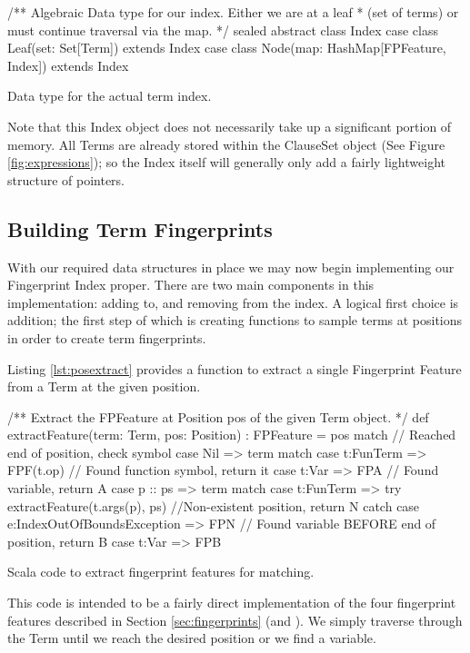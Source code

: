 \begin{listing}[H]
\begin{scalacode}
/** Algebraic Data type for our index. Either we are at a leaf
  * (set of terms) or must continue traversal via the map. */ 
sealed abstract class Index
case class Leaf(set: Set[Term])                 extends Index
case class Node(map: HashMap[FPFeature, Index]) extends Index
\end{scalacode}
\caption{Data type for the actual term index. \protect\cite[p7]{shulz12}}
\label{lst:indexdata}
\end{listing}

Note that this Index object does not necessarily take up a significant portion of memory.
All Terms are already stored within the ClauseSet object (See Figure \ref{fig:expressions});
so the Index itself will generally only add a fairly lightweight structure of pointers.


\subsection{Building Term Fingerprints}
\label{sec:fpbuild}
With our required data structures in place we may now begin implementing our
Fingerprint Index proper. There are two main components in this implementation:
adding to, and removing from the index. A logical first choice is addition; the
first step of which is creating functions to sample terms at positions in order to
create term fingerprints.

Listing \ref{lst:posextract} provides a function to extract a single Fingerprint Feature from
a Term at the given position.
\begin{listing}[H]
\begin{scalacode}
/** Extract the FPFeature at Position pos of the given Term object. */
def extractFeature(term: Term, pos: Position) : FPFeature = pos match {
  // Reached end of position, check symbol
  case Nil     => term match {
    case t:FunTerm => FPF(t.op) // Found function symbol, return it
    case t:Var     => FPA       // Found variable, return A
  }
  case p :: ps => term match {
    case t:FunTerm => try   {extractFeature(t.args(p), ps)}
                      //Non-existent position, return N
                      catch {case e:IndexOutOfBoundsException => FPN}
    // Found variable BEFORE end of position, return B
    case t:Var     => FPB 
  }
}
\end{scalacode}
\caption{Scala code to extract fingerprint features for matching.}
\label{lst:posextract}
\end{listing}
This code is intended to be a fairly direct implementation of the four
fingerprint features described in Section \ref{sec:fingerprints}
(and \cite{shulz12}). We simply traverse through the Term until
we reach the desired position or we find a variable.

